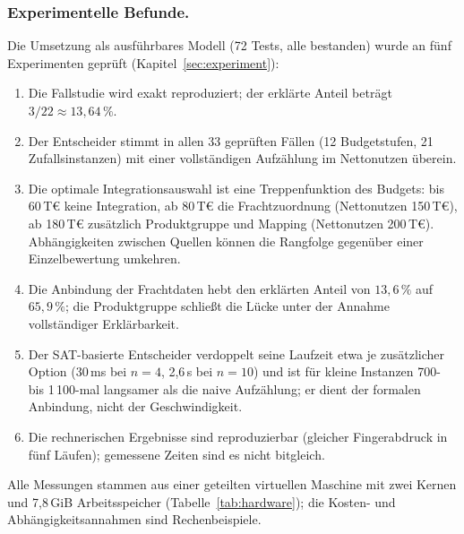 \documentclass[a4paper,12pt,twoside]{report}
\theoremstyle{definition}
\begin{document}
\subsubsection{Experimentelle Befunde.}
Die Umsetzung als ausführbares Modell (72 Tests, alle bestanden) wurde an fünf Experimenten geprüft (Kapitel~\ref{sec:experiment}):
\begin{enumerate}
\item Die Fallstudie wird exakt reproduziert; der erklärte Anteil beträgt $3/22\approx 13{,}64\,\%$.
\item Der Entscheider stimmt in allen 33 geprüften Fällen (12 Budgetstufen, 21 Zufallsinstanzen) mit einer vollständigen Aufzählung im Nettonutzen überein.
\item Die optimale Integrationsauswahl ist eine Treppenfunktion des Budgets: bis 60\,T€ keine Integration, ab 80\,T€ die Frachtzuordnung (Nettonutzen 150\,T€), ab 180\,T€ zusätzlich Produktgruppe und Mapping (Nettonutzen 200\,T€). Abhängigkeiten zwischen Quellen können die Rangfolge gegenüber einer Einzelbewertung umkehren.
\item Die Anbindung der Frachtdaten hebt den erklärten Anteil von $13{,}6\,\%$ auf $65{,}9\,\%$; die Produktgruppe schließt die Lücke unter der Annahme vollständiger Erklärbarkeit.
\item Der SAT-basierte Entscheider verdoppelt seine Laufzeit etwa je zusätzlicher Option (30\,ms bei $n=4$, 2{,}6\,s bei $n=10$) und ist für kleine Instanzen 700- bis 1\,100-mal langsamer als die naive Aufzählung; er dient der formalen Anbindung, nicht der Geschwindigkeit.
\item Die rechnerischen Ergebnisse sind reproduzierbar (gleicher Fingerabdruck in fünf Läufen); gemessene Zeiten sind es nicht bitgleich.
\end{enumerate}
Alle Messungen stammen aus einer geteilten virtuellen Maschine mit zwei Kernen und 7{,}8\,GiB Arbeitsspeicher (Tabelle~\ref{tab:hardware}); die Kosten- und Abhängigkeitsannahmen sind Rechenbeispiele.
\end{document}

